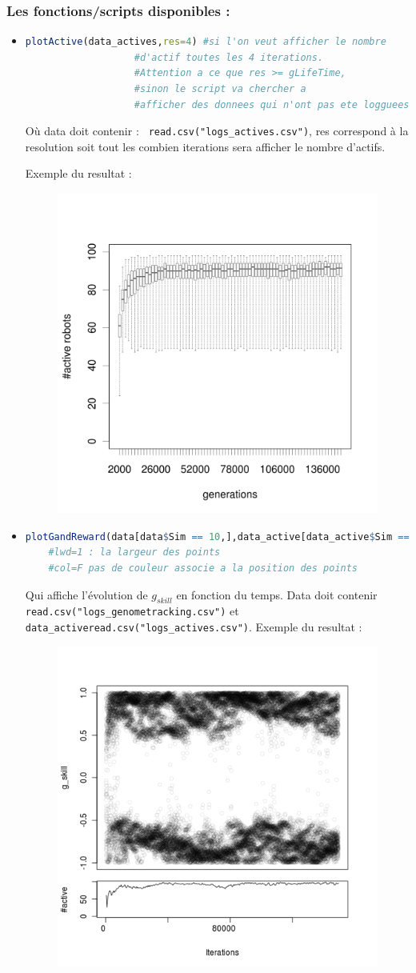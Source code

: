 \documentclass[a4paper,10pt]{report}
\begin{document}
\subsubsection{Les fonctions/scripts disponibles :}
\begin{itemize}
\item \begin{lstlisting}[language=R]
plotActive(data_actives,res=4) #si l'on veut afficher le nombre 
			       #d'actif toutes les 4 iterations.
			       #Attention a ce que res >= gLifeTime,
			       #sinon le script va chercher a 
			       #afficher des donnees qui n'ont pas ete logguees
\end{lstlisting}
Où data doit contenir : \verb? read.csv("logs_actives.csv")?, res correspond à la resolution soit tout les combien iterations sera afficher le nombre d'actifs.

Exemple du resultat :
\begin{figure}[h]
\center
\includegraphics[width=.25\textwidth]{../images/5StaticEnv/alive_staticEnv1}
\end{figure}


\item \begin{lstlisting}[language=R]
plotGandReward(data[data$Sim == 10,],data_active[data_active$Sim == 10,],lwd=1,col=F)
	#lwd=1 : la largeur des points
	#col=F pas de couleur associe a la position des points
\end{lstlisting}
Qui affiche l'évolution de $g_{skill}$ en fonction du temps.
Data doit contenir \verb?read.csv("logs_genometracking.csv")? et \verb?data_active?\verb?read.csv("logs_actives.csv")?.
Exemple du resultat :
\begin{figure}[H]
\center
\includegraphics[width=.25\textwidth]{../images/5StaticEnv/Gplot58_staticEnv1}
\end{figure}


\end{itemize}
\end{document}
